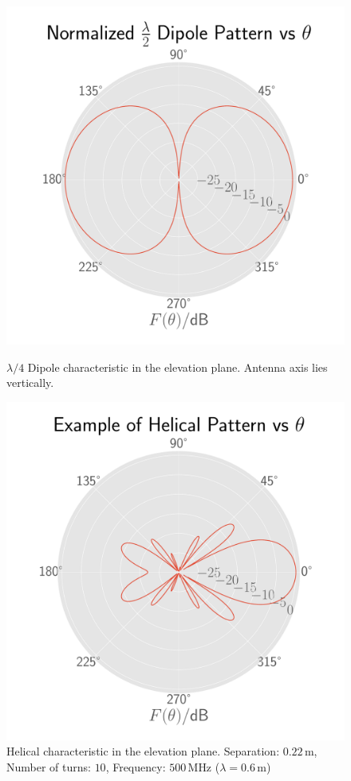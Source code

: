\documentclass[10pt, a4paper]{article}
\begin{document}
\begin{figure}[H]
  \begin{minipage}[t]{0.45\textwidth}
    \centering
    \includegraphics[width=\textwidth]{graphics/dipole_theta.pdf}
    \caption{$\lambda/4$ Dipole characteristic in the elevation plane. Antenna axis lies vertically.}
  \end{minipage}\hfill
  \begin{minipage}[t]{0.45\textwidth}
    \centering
    \includegraphics[width=\textwidth]{graphics/helical_theta.pdf}
    \caption{Helical characteristic in the elevation plane. Separation: $0.22\,\si{\meter}$, Number of turns: $10$, Frequency: $500\,\si{\mega\hertz}$ ($\lambda=0.6\,\si{\meter}$)}
  \end{minipage}
\end{figure}
\end{document}

